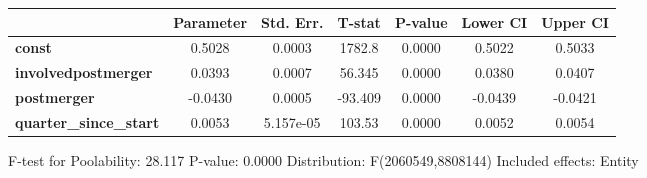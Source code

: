 \documentclass{report}
\begin{document}
\begin{center}
\begin{tabular}{lcccccc}
                               & \textbf{Parameter} & \textbf{Std. Err.} & \textbf{T-stat} & \textbf{P-value} & \textbf{Lower CI} & \textbf{Upper CI}  \\
\midrule
\textbf{const}                 &       0.5028       &       0.0003       &      1782.8     &      0.0000      &       0.5022      &       0.5033       \\
\textbf{involvedpostmerger}    &       0.0393       &       0.0007       &      56.345     &      0.0000      &       0.0380      &       0.0407       \\
\textbf{postmerger}            &      -0.0430       &       0.0005       &     -93.409     &      0.0000      &      -0.0439      &      -0.0421       \\
\textbf{quarter\_since\_start} &       0.0053       &     5.157e-05      &      103.53     &      0.0000      &       0.0052      &       0.0054       \\
\bottomrule
\end{tabular}
\end{center}

F-test for Poolability: 28.117 \newline
 P-value: 0.0000 \newline
 Distribution: F(2060549,8808144) \newline
  \newline
 Included effects: Entity
\end{document}

